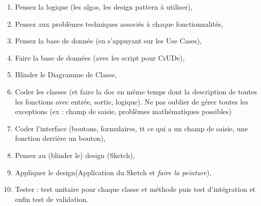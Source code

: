 \documentclass[a4paper,12pt,twoside]{article}
\begin{document}
\begin{enumerate}
 \item Pensez la logique (les algos, les design pattern à utiliser), 
 \item Pensez aux problèmes techniques associés à chaque fonctionnalités,
 \item Pensez la base de donnée (en s'appuyant sur les Use Cases),
 \item Faire la base de données (avec les script pour CrUDe),
 \item Blinder le Diagramme de Classe,
 \item Coder les classes (et faire la doc en même temps dont la description de toutes les fonctions avec entrée, sortie, logique). Ne pas oublier de gérer toutes les exceptions (ex :  champ de saisie, problèmes mathématiques possibles)
 \item Coder l'interface (boutons, formulaires, tt ce qui a un champ de saisie, une fonction derrière un bouton),
 \item Pensez au (blinder le) design (Sketch),
 \item Appliquer le design(Application du Sketch et \textit{faire la peinture}),
 \item Tester : test unitaire pour chaque classe et méthode puis test d'intégration et enfin test de validation.
\end{enumerate}

\end{document}
